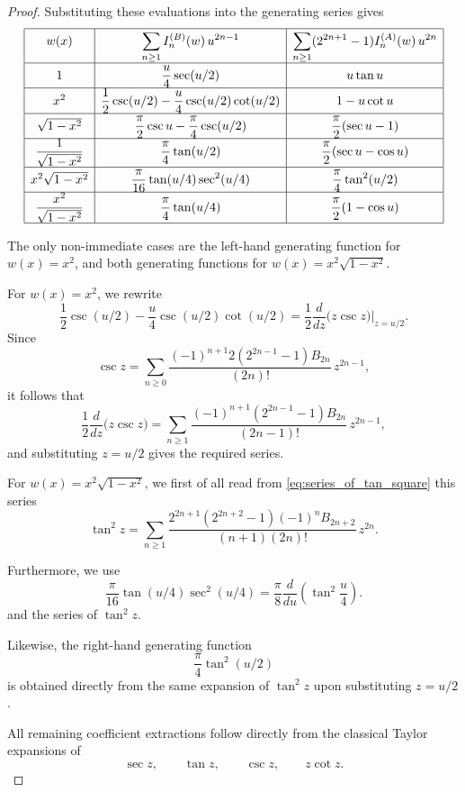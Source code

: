 \documentclass[11pt,twoside]{article}
\numberwithin{equation}{section}
\begin{document}
\begin{proof}
Substituting these evaluations into the generating series gives
\[
\renewcommand{\arraystretch}{1.5}
\begin{array}{|c|c|c|}
\hline
w(x)
&
\displaystyle \sum_{n\ge1} I_n^{(B)}(w)\,u^{2n-1}
&
\displaystyle \sum_{n\ge1}(2^{2n+1}-1)I_n^{(A)}(w)\,u^{2n}
\\ \hline
1
&
\displaystyle \frac{u}{4}\sec(u/2)
&
\displaystyle u\tan u
\\ \hline
x^2
&
\displaystyle \frac12\csc(u/2)-\frac{u}{4}\csc(u/2)\cot(u/2)
&
\displaystyle 1-u\cot u
\\ \hline
\sqrt{1-x^2}
&
\displaystyle \frac{\pi}{2}\csc u-\frac{\pi}{4}\csc(u/2)
&
\displaystyle \frac{\pi}{2}(\sec u-1)
\\ \hline
\displaystyle \frac{1}{\sqrt{1-x^2}}
&
\displaystyle \frac{\pi}{4}\tan(u/2)
&
\displaystyle \frac{\pi}{2}(\sec u-\cos u)
\\ \hline
x^2\sqrt{1-x^2}
&
\displaystyle \frac{\pi}{16}\tan(u/4)\sec^2(u/4)
&
\displaystyle \frac{\pi}{4}\tan^2(u/2)
\\ \hline
\displaystyle \frac{x^2}{\sqrt{1-x^2}}
&
\displaystyle \frac{\pi}{4}\tan(u/4)
&
\displaystyle \frac{\pi}{2}(1-\cos u)
\\ \hline
\end{array}
\]

The only non-immediate cases are the left-hand generating function for \(w(x)=x^2\), and both generating functions for \(w(x)=x^2\sqrt{1-x^2}\).

\vspace{0.2cm}

For \(w(x)=x^2\), we rewrite
\[
\frac12\csc(u/2)-\frac{u}{4}\csc(u/2)\cot(u/2)
=
\frac12\frac{d}{dz}\bigl(z\csc z\bigr)\Big|_{z=u/2}.
\]
Since
\[
\csc z
=
\sum_{n\ge0}\frac{(-1)^{n+1}2(2^{2n-1}-1)B_{2n}}{(2n)!}\,z^{2n-1},
\]
it follows that
\[
\frac12\frac{d}{dz}\bigl(z\csc z\bigr)
=
\sum_{n\ge1}
\frac{(-1)^{n+1}(2^{2n-1}-1)B_{2n}}{(2n-1)!}\,z^{2n-1},
\]
and substituting \(z=u/2\) gives the required series.

\vspace{0.2cm}

For \(w(x)=x^2\sqrt{1-x^2}\), we first of all read from \eqref{eq:series_of_tan_square} this series
\[
\tan^2 z
=
\sum_{n\ge1}
\frac{2^{2n+1}(2^{2n+2}-1)(-1)^nB_{2n+2}}{(n+1)(2n)!}\,z^{2n}.
\]

Furthermore, we use
\[
\frac{\pi}{16}\tan(u/4)\sec^2(u/4)
=
\frac{\pi}{8}\frac{d}{du}\!\left(\tan^2\frac{u}{4}\right).
\] and the series of $\tan^2 z$.

Likewise, the right-hand generating function
\[
\frac{\pi}{4}\tan^2(u/2)
\]
is obtained directly from the same expansion of \(\tan^2 z\) upon substituting \(z=u/2\).

All remaining coefficient extractions follow directly from the classical Taylor expansions of
\[
\sec z,\qquad \tan z,\qquad \csc z,\qquad z\cot z.
\]
\end{proof}
\end{document}
